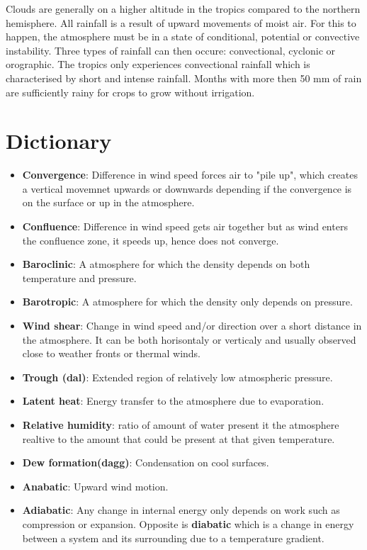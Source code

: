 \documentclass{article}
\begin{document}
	Clouds are generally on a higher altitude in the tropics compared to the northern hemisphere. All rainfall is a result of upward movements of moist air. For this to happen, the atmosphere must be in a state of conditional, potential or convective instability. Three types of rainfall can then occure: convectional, cyclonic or orographic. The tropics only experiences convectional rainfall which is characterised by short and intense rainfall. Months with more then 50 mm of rain are sufficiently rainy for crops to grow without irrigation.
	
	\section{Dictionary}
	\begin{itemize}
		\item \textbf{Convergence}: Difference in wind speed forces air to "pile up", which creates a vertical movemnet upwards or downwards depending if the convergence is on the surface or up in the atmosphere.
		\item \textbf{Confluence}: Difference in wind speed gets air together but as wind enters the confluence zone, it speeds up, hence does not converge.
		\item \textbf{Baroclinic}: A atmosphere for which the density depends on both temperature and pressure.
		\item \textbf{Barotropic}: A atmosphere for which the density only depends on pressure.
		\item \textbf{Wind shear}: Change in wind speed and/or direction over a short distance in the atmosphere. It can be both horisontaly or verticaly and usually observed close to weather fronts or thermal winds.
		\item \textbf{Trough (dal)}: Extended region of relatively low atmospheric pressure.
		\item \textbf{Latent heat}: Energy transfer to the atmosphere due to evaporation.
		\item \textbf{Relative humidity}: ratio of amount of water present it the atmosphere realtive to the amount that could be present at that given temperature.
		\item \textbf{Dew formation(dagg)}: Condensation on cool surfaces.
		\item \textbf{Anabatic}: Upward wind motion.
		\item \textbf{Adiabatic}: Any change in internal energy only depends on work such as compression or expansion. Opposite is \textbf{diabatic} which is a change in energy between a system and its surrounding due to a temperature gradient.

\end{itemize}
\end{document}
